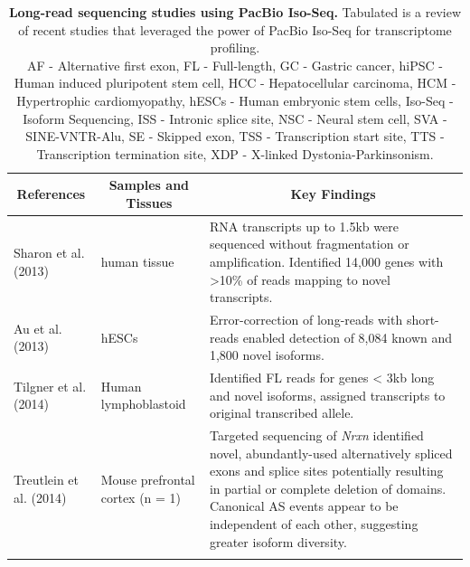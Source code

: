 \begin{landscape}
	\small %
	\setlength\tabcolsep{2pt} %
	\renewcommand{\arraystretch}{1}
	\begin{longtable}[c]{p{4cm}p{4cm}p{18cm}}
		\caption[Long-read sequencing studies using PacBio Iso-Seq]%
		{\textbf{Long-read sequencing studies using PacBio Iso-Seq.} Tabulated is a review of recent studies that leveraged the power of PacBio Iso-Seq for transcriptome profiling. \newline AF - Alternative first exon, FL - Full-length, GC - Gastric cancer, hiPSC - Human induced pluripotent stem cell, HCC - Hepatocellular carcinoma, HCM - Hypertrophic cardiomyopathy, hESCs - Human embryonic stem cells, Iso-Seq - Isoform Sequencing, ISS - Intronic splice site, NSC - Neural stem cell, SVA - SINE-VNTR-Alu, SE - Skipped exon, TSS - Transcription start site, TTS - Transcription termination site, XDP - X-linked Dystonia-Parkinsonism.}
		\label{tab: longread_isoseqstudies}\\
		
		\toprule
		\multicolumn{1}{c}{References} &
		\multicolumn{1}{c}{Samples and Tissues} &
		\multicolumn{1}{c}{Key Findings} \\* \midrule
		\endfirsthead
		\endhead
		\bottomrule
		\endfoot
		\endlastfoot
		\centering Sharon et al. (2013)\cite{Sharon2013} &
		\centering 20 human tissue &
		\tabitem RNA transcripts up to 1.5kb were sequenced without fragmentation or amplification. \newline
		\tabitem Identified 14,000 genes with >10\% of reads mapping to novel transcripts.  \\
		\hdashline[0.5pt/5pt] 
		
		\centering Au et al. (2013)\cite{Au2013} &
		\centering hESCs &
		\tabitem Error-correction of long-reads with short-reads enabled detection of 8,084 known and 1,800 novel isoforms. \\
		\hdashline[0.5pt/5pt]
		
		\centering Tilgner et al. (2014) \cite{Tilgner2014} &
		\centering Human lymphoblastoid  &
		\tabitem Identified FL reads for genes < 3kb long and novel isoforms, assigned transcripts to original transcribed allele. \\
		\hdashline[0.5pt/5pt]
		
		\centering Treutlein et al. (2014)\cite{Treutlein2014} &
		\centering Mouse prefrontal cortex (n = 1) &
		\tabitem Targeted sequencing of \textit{Nrxn} identified novel, abundantly-used alternatively spliced exons and splice sites potentially resulting in partial or complete deletion of domains. \newline
		\tabitem Canonical AS events appear to be independent of each other, suggesting greater isoform diversity.  \\
		\hdashline[0.5pt/5pt]
		

\end{longtable}
\end{landscape}
